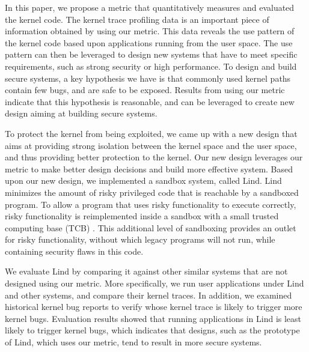 In this paper, we propose a metric that quantitatively measures and evaluated 
the 
kernel code. The kernel trace profiling data is an important piece of information 
obtained by using our metric. 
This data reveals the use pattern of the kernel code 
based upon applications running from the user space. The use pattern can then be
leveraged to design new systems that have to meet specific requirements, 
such as strong security or high performance. To design and build secure systems, 
a key hypothesis we have is that commonly used kernel paths contain few bugs, and are 
safe to be exposed. Results from using our metric indicate that this hypothesis is reasonable, and 
can be leveraged to create new design aiming at building secure systems. 

To protect the kernel from being exploited, we came up with a new design 
that aims at providing strong isolation between the kernel space and the user space, 
and thus providing better protection to the kernel. Our new design leverages 
our metric to make better design decisions and build more effective system. 
Based upon our new design, we implemented a sandbox system, called Lind.
Lind minimizes the amount of risky privileged code that is reachable by a
sandboxed program.  To allow a program that uses risky functionality to
execute correctly, risky functionality is reimplemented inside a sandbox with
a small trusted computing base (TCB) . 
This additional level of sandboxing provides an outlet for risky functionality, without which
legacy programs will not run, while containing security flaws in this code. 

We evaluate Lind by comparing it against other similar systems 
that are not designed using our metric. More specifically, we run user applications
under Lind and other systems, and compare their kernel traces. In addition, we examined historical
kernel bug reports to verify whose kernel trace is likely to trigger more
kernel bugs. 
Evaluation results showed that running applications in Lind is least likely to trigger kernel bugs, 
which indicates that designs, such as the prototype of Lind, which uses our metric, 
tend to result in more secure systems. 

